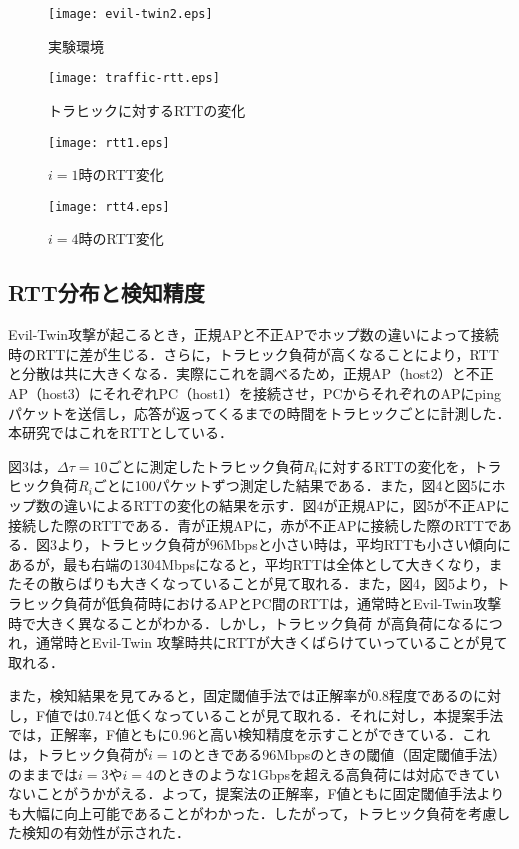 \documentclass[twocolumn, a4paper]{ieicejsp}
\begin{document}
\begin{figure}[htbp]
  \centering
  \texttt{[image: evil-twin2.eps]}
  \caption{実験環境}
\label{fig_PowerConsumption}
\end{figure}

\begin{figure}[htbp]
  \centering
  \texttt{[image: traffic-rtt.eps]}
  \caption{トラヒックに対するRTTの変化}
\label{fig_PowerConsumption}
\end{figure}

\begin{figure}[t]
  \centering
  \texttt{[image: rtt1.eps]}
  \caption{$i=1$時のRTT変化}
\label{fig_PowerConsumption}
\end{figure}

\begin{figure}[t]
  \centering
  \texttt{[image: rtt4.eps]}
  \caption{$i=4$時のRTT変化}
\label{fig_PowerConsumption}
\end{figure}
 
\subsection{RTT分布と検知精度}
Evil-Twin攻撃が起こるとき，正規APと不正APでホップ数の違いによって接続時のRTTに差が生じる．さらに，トラヒック負荷が高くなることにより，RTTと分散は共に大きくなる．実際にこれを調べるため，正規AP（host2）と不正AP（host3）にそれぞれPC（host1）を接続させ，PCからそれぞれのAPにpingパケットを送信し，応答が返ってくるまでの時間をトラヒックごとに計測した．本研究ではこれをRTTとしている．\par
図3は，${\Delta \tau}=10$ごとに測定したトラヒック負荷$R_i$に対するRTTの変化を，トラヒック負荷$R_i$ごとに100パケットずつ測定した結果である．また，図4と図5にホップ数の違いによるRTTの変化の結果を示す．図4が正規APに，図5が不正APに接続した際のRTTである．青が正規APに，赤が不正APに接続した際のRTTである．図3より，トラヒック負荷が96Mbpsと小さい時は，平均RTTも小さい傾向にあるが，最も右端の1304Mbpsになると，平均RTTは全体として大きくなり，またその散らばりも大きくなっていることが見て取れる．また，図4，図5より，トラヒック負荷が低負荷時におけるAPとPC間のRTTは，通常時とEvil-Twin攻撃時で大きく異なることがわかる．しかし，トラヒック負荷
が高負荷になるにつれ，通常時とEvil-Twin 攻撃時共にRTTが大きくばらけていっていることが見て取れる．\par
また，検知結果を見てみると，固定閾値手法では正解率が0.8程度であるのに対し，F値では0.74と低くなっていることが見て取れる．それに対し，本提案手法では，正解率，F値ともに0.96と高い検知精度を示すことができている．これは，トラヒック負荷が$i=1$のときである96Mbpsのときの閾値（固定閾値手法）のままでは$i=3$や$i=4$のときのような1Gbpsを超える高負荷には対応できていないことがうかがえる．よって，提案法の正解率，F値ともに固定閾値手法よりも大幅に向上可能であることがわかった．したがって，トラヒック負荷を考慮した検知の有効性が示された．
\end{document}
